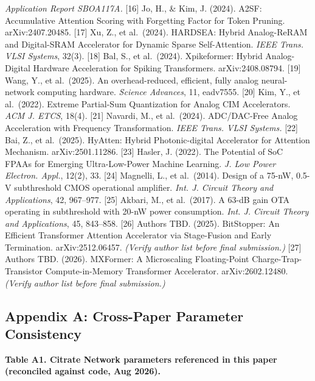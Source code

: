 \emph{Application Report SBOA117A.} {[}16{]} Jo, H., \& Kim, J. (2024).
A2SF: Accumulative Attention Scoring with Forgetting Factor for Token
Pruning. arXiv:2407.20485. {[}17{]} Xu, Z., et al.~(2024). HARDSEA:
Hybrid Analog-ReRAM and Digital-SRAM Accelerator for Dynamic Sparse
Self-Attention. \emph{IEEE Trans. VLSI Systems}, 32(3). {[}18{]} Bal,
S., et al.~(2024). Xpikeformer: Hybrid Analog-Digital Hardware
Acceleration for Spiking Transformers. arXiv:2408.08794. {[}19{]} Wang,
Y., et al.~(2025). An overhead-reduced, efficient, fully analog
neural-network computing hardware. \emph{Science Advances}, 11,
eadv7555. {[}20{]} Kim, Y., et al.~(2022). Extreme Partial-Sum
Quantization for Analog CIM Accelerators. \emph{ACM J. ETCS}, 18(4).
{[}21{]} Navardi, M., et al.~(2024). ADC/DAC-Free Analog Acceleration
with Frequency Transformation. \emph{IEEE Trans. VLSI Systems.} {[}22{]}
Bai, Z., et al.~(2025). HyAtten: Hybrid Photonic-digital Accelerator for
Attention Mechanism. arXiv:2501.11286. {[}23{]} Hasler, J. (2022). The
Potential of SoC FPAAs for Emerging Ultra-Low-Power Machine Learning.
\emph{J. Low Power Electron. Appl.}, 12(2), 33. {[}24{]} Magnelli, L.,
et al.~(2014). Design of a 75-nW, 0.5-V subthreshold CMOS operational
amplifier. \emph{Int. J. Circuit Theory and Applications}, 42, 967--977.
{[}25{]} Akbari, M., et al.~(2017). A 63-dB gain OTA operating in
subthreshold with 20-nW power consumption. \emph{Int. J. Circuit Theory
and Applications}, 45, 843--858. {[}26{]} Authors TBD. (2025).
BitStopper: An Efficient Transformer Attention Accelerator via
Stage-Fusion and Early Termination. arXiv:2512.06457. \emph{(Verify
author list before final submission.)} {[}27{]} Authors TBD. (2026).
MXFormer: A Microscaling Floating-Point Charge-Trap-Transistor
Compute-in-Memory Transformer Accelerator. arXiv:2602.12480.
\emph{(Verify author list before final submission.)}

\subsection{Appendix A: Cross-Paper Parameter
Consistency}\label{appendix-a-cross-paper-parameter-consistency}

\textbf{Table A1. Citrate Network parameters referenced in this paper
(reconciled against code, Aug 2026).}

